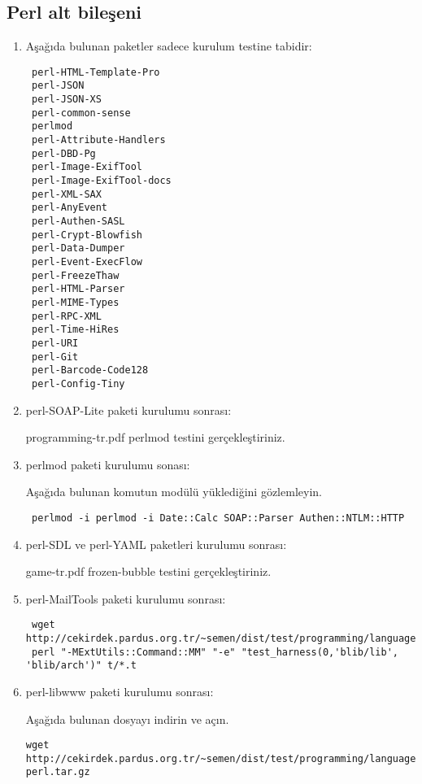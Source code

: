 \documentclass[a4paper,10pt]{article}
\begin{document}
\subsection{Perl alt bileşeni}
\begin{enumerate}
\item Aşağıda bulunan paketler sadece kurulum testine tabidir:
\begin{verbatim}
 perl-HTML-Template-Pro
 perl-JSON
 perl-JSON-XS
 perl-common-sense
 perlmod
 perl-Attribute-Handlers
 perl-DBD-Pg
 perl-Image-ExifTool
 perl-Image-ExifTool-docs
 perl-XML-SAX
 perl-AnyEvent
 perl-Authen-SASL
 perl-Crypt-Blowfish
 perl-Data-Dumper
 perl-Event-ExecFlow
 perl-FreezeThaw
 perl-HTML-Parser
 perl-MIME-Types
 perl-RPC-XML
 perl-Time-HiRes
 perl-URI
 perl-Git
 perl-Barcode-Code128
 perl-Config-Tiny
\end{verbatim}

\item perl-SOAP-Lite paketi kurulumu sonrası:

programming-tr.pdf perlmod testini gerçekleştiriniz.

\item perlmod paketi kurulumu sonası:

Aşağıda bulunan komutun modülü yüklediğini gözlemleyin.

\begin{verbatim}
 perlmod -i perlmod -i Date::Calc SOAP::Parser Authen::NTLM::HTTP
\end{verbatim}

\item perl-SDL ve perl-YAML paketleri kurulumu sonrası:

game-tr.pdf frozen-bubble testini gerçekleştiriniz.

\item perl-MailTools paketi kurulumu sonrası:
\begin{verbatim}
 wget http://cekirdek.pardus.org.tr/~semen/dist/test/programming/language/perl/MailTools.tar.gz
 perl "-MExtUtils::Command::MM" "-e" "test_harness(0,'blib/lib', 'blib/arch')" t/*.t
\end{verbatim}

\item perl-libwww paketi kurulumu sonrası:

Aşağıda bulunan dosyayı indirin ve açın.
\begin{verbatim}
wget http://cekirdek.pardus.org.tr/~semen/dist/test/programming/language/perl/libwww-perl.tar.gz
\end{verbatim}


\end{enumerate}
\end{document}
